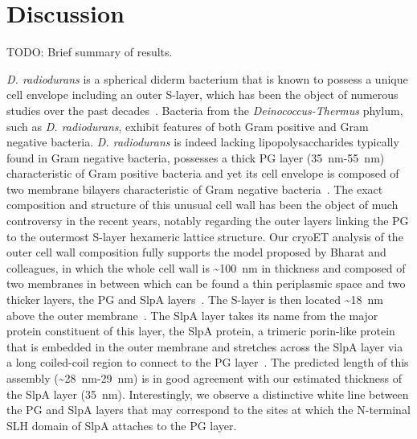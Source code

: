 \FloatBarrier

\section{Discussion}

TODO: Brief summary of results.

\textit{D. radiodurans} is a spherical diderm bacterium that is known to possess a unique cell envelope including an outer S-layer, which has been the object of numerous studies over the past decades~\cite{vonkugelgenMultidomainConnectorLinks2022,workMorphologyChemistryCell1968,rothfussInvolvementSlayerProteins2006,vonkugelgenInterdigitatedImmunoglobulinArrays2023,farciSDBCActiveQuenching2023,farciStructuredOrganizationDeinococcus2022,farciCryoEMStructureSlayer2022,farciStructuralAnalysisArchitecture2021,baumeisterThreedimensionalStructureRegular1986,baumeisterStructureCellEnvelope1981}.
Bacteria from the \textit{Deinococcus-Thermus} phylum, such as \textit{D. radiodurans}, exhibit features of both Gram positive and Gram negative bacteria.
\textit{D. radiodurans} is indeed lacking lipopolysaccharides typically found in Gram negative bacteria, possesses a thick PG layer (\qty{35}{nm}-\qty{55}{nm}) characteristic of Gram positive bacteria and yet its cell envelope is composed of two membrane bilayers characteristic of Gram negative bacteria~\cite{guptaOriginDidermGramnegative2011}.
The exact composition and structure of this unusual cell wall has been the object of much controversy in the recent years, notably regarding the outer layers linking the PG to the outermost S-layer hexameric lattice structure.
Our cryoET analysis of the outer cell wall composition fully supports the model proposed by Bharat and colleagues, in which the whole cell wall is \sim\qty{100}{nm} in thickness and composed of two membranes in between which can be found a thin periplasmic space and two thicker layers, the PG and SlpA layers~\cite{vonkugelgenMultidomainConnectorLinks2022}.
The S-layer is then located \sim\qty{18}{nm} above the outer membrane~\cite{vonkugelgenInterdigitatedImmunoglobulinArrays2023}.
The SlpA layer takes its name from the major protein constituent of this layer, the SlpA protein, a trimeric porin-like protein that is embedded in the outer membrane and stretches across the SlpA layer via a long coiled-coil region to connect to the PG layer~\cite{vonkugelgenMultidomainConnectorLinks2022}.
The predicted length of this assembly (\sim\qty{28}{nm}-\qty{29}{nm}) is in good agreement with our estimated thickness of the SlpA layer (\qty{35}{nm}).
Interestingly, we observe a distinctive white line between the PG and SlpA layers that may correspond to the sites at which the N-terminal SLH domain of SlpA attaches to the PG layer.

